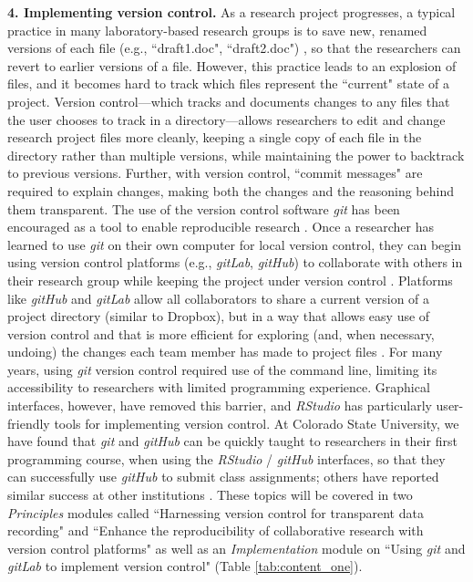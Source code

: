 \documentclass[pdftex,english,11.5pt,parskip=half]{scrartcl}
\begin{document}
\textbf{4. Implementing version control.} As a research project progresses, a typical practice in many laboratory-based research groups is to save new, renamed versions of each file (e.g., ``draft1.doc", ``draft2.doc") \cite{bryan2018excuse}, so that the researchers can revert to earlier versions of a file. However, this practice leads to an explosion of files, and it becomes hard to track which files represent the ``current" state of a project. Version control---which tracks and documents changes to any files that the user chooses to track in a directory---allows researchers to edit and change research project files more cleanly, keeping a single copy of each file in the directory rather than multiple versions, while maintaining the power to backtrack to previous versions. Further, with version control, ``commit messages" are required to explain changes, making both the changes and the reasoning behind them transparent. The use of the version control software \textit{git} has been encouraged as a tool to enable reproducible research \cite{piccolo2016tools, ram2013git, bryan2018excuse, lowndes2017our, cetinkaya2017infrastructure}. Once a researcher has learned to use \textit{git} on their own computer for local version control, they can begin using version control 
platforms (e.g., \textit{gitLab}, \textit{gitHub}) to collaborate with others in their research
group while keeping the project under version control \cite{bryan2018excuse, shade2015computing}. Platforms like \textit{gitHub} and \textit{gitLab} allow
all collaborators to share a current version of a project directory 
(similar to Dropbox), but in a way that allows easy use of version control 
and that is more efficient for exploring (and, when necessary, undoing) the changes 
each team member has made to project files \cite{bryan2018excuse}. For many years, using \textit{git} version control required use of the command line,
limiting its accessibility to researchers with limited programming experience.
Graphical interfaces, however, have removed this barrier, and \textit{RStudio} has 
particularly user-friendly tools for implementing version control. At Colorado State University, we have found that \textit{git} and \textit{gitHub} can be quickly taught  to researchers in their first programming course, when using the \textit{RStudio} / \textit{gitHub} interfaces, so that they can successfully use \textit{gitHub} to submit class assignments; others have reported similar success at other institutions \cite{bryan2018excuse}. These
topics will be covered in two \textit{Principles} modules called ``Harnessing
version control for transparent data recording" and ``Enhance the
reproducibility of collaborative research with version control platforms" as
well as an \textit{Implementation} module on ``Using \textit{git} and \textit{gitLab} to implement
version control" (Table \ref*{tab:content_one}). 
\end{document}
